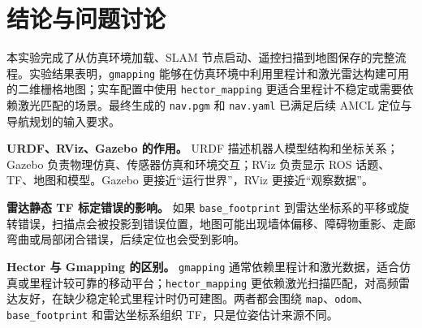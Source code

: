 \documentclass[11pt,a4paper,fontset=fandol]{ctexart}
\begin{document}
\section{结论与问题讨论}

本实验完成了从仿真环境加载、SLAM 节点启动、遥控扫描到地图保存的完整流程。实验结果表明，\verb|gmapping| 能够在仿真环境中利用里程计和激光雷达构建可用的二维栅格地图；实车配置中使用 \verb|hector_mapping| 更适合里程计不稳定或需要依赖激光匹配的场景。最终生成的 \verb|nav.pgm| 和 \verb|nav.yaml| 已满足后续 AMCL 定位与导航规划的输入要求。

\textbf{URDF、RViz、Gazebo 的作用。}
URDF 描述机器人模型结构和坐标关系；Gazebo 负责物理仿真、传感器仿真和环境交互；RViz 负责显示 ROS 话题、TF、地图和模型。Gazebo 更接近“运行世界”，RViz 更接近“观察数据”。

\textbf{雷达静态 TF 标定错误的影响。}
如果 \verb|base_footprint| 到雷达坐标系的平移或旋转错误，扫描点会被投影到错误位置，地图可能出现墙体偏移、障碍物重影、走廊弯曲或局部闭合错误，后续定位也会受到影响。

\textbf{Hector 与 Gmapping 的区别。}
\verb|gmapping| 通常依赖里程计和激光数据，适合仿真或里程计较可靠的移动平台；\verb|hector_mapping| 更依赖激光扫描匹配，对高频雷达友好，在缺少稳定轮式里程计时仍可建图。两者都会围绕 \verb|map|、\verb|odom|、\verb|base_footprint| 和雷达坐标系组织 TF，只是位姿估计来源不同。
\end{document}
